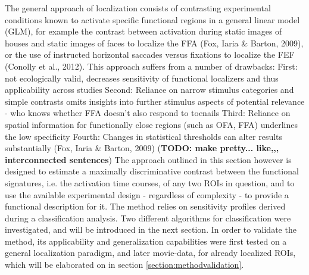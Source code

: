 \documentclass[a4paper, 12pt]{scrreprt}
\begin{document}
The general approach of localization consists of contrasting experimental conditions known to activate specific functional regions in a general linear model (GLM), for example the contrast between activation during static images of houses and static images of faces to localize the FFA (Fox, Iaria \& Barton, 2009), or the use of instructed horizontal saccades versus fixations to localize the FEF (Conolly et al., 2012). This approach suffers from a number of drawbacks: \newline
First: not ecologically valid, decreases sensitivity of functional localizers and thus applicability across studies \newline
Second: Reliance on narrow stimulus categories and simple contrasts omits insights into further stimulus aspects of potential relevance - who knows whether FFA doesn't also respond to toenails \newline
Third: Reliance on spatial information for functionally close regions (such as OFA, FFA) underlines the low specificity \newline
Fourth: Changes in statistical thresholds can alter results substantially (Fox, Iaria \& Barton, 2009) (\textbf{TODO: make pretty... like,,, interconnected sentences})\newline
The approach outlined in this section however is designed to estimate a maximally discriminative contrast between the functional signatures, i.e. the activation time courses, of any two ROIs in question, and to use the available experimental design - regardless of complexity - to provide a functional description for it.\newline
The method relies on sensitivity profiles derived during a classification analysis. Two different algorithms for classification were investigated, and will be introduced in the next section. In order to validate the method, its applicability and generalization capabilities were first tested on a general localization paradigm, and later movie-data, for already localized ROIs, which will be elaborated on in section \ref{section:methodvalidation}.
\end{document}
